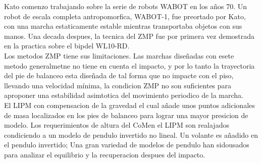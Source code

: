 \documentclass[10pt,onecolumn,twoside,letterpaper]{article}
\begin{document}
Kato comenzo trabajando sobre la serie de robots WABOT en los a\~nos 70. Un robot de escala completa antropomorfica, WABOT-1, fue preortado por Kato, con una marcha estaticamente estable mientras transportaba objetos con sus manos. Una decada despues, la tecnica del ZMP fue por primera vez demostrada en la practica sobre el bipdel WL10-RD.\cite{Grizzle2014}\\
Los metodos ZMP tiene sus limitaciones. Las marchas dise\~nadas con esete metodo generalmetne no tiene en cuenta el impacto, y por lo tanto la trayectoria del pie de balanceo esta dise\~nada de tal forma que no impacte con el piso, llevando una velocidad m\'inima, la condicion ZMP no son suficientes para aproponer una estabilidad asimtotica del movimiento periodico de la marcha.\cite{Grizzle2014}\\
El LIPM con compensacion de la gravedad el cual a\~nade unos puntos adicionales de masa localizados en los pies de balanceo para lograr una mayor presicion de modelo. Los requerimientos de altura del CoMen el LIPM son realajados condiciendo a un modelo de pendulo invertido no lineal. Un volante es a\~nadido en el pendulo invertido; Una gran variedad de modelos de pendulo han sidousados para analizar el equilibrio y la recuperacion despues del impacto.\cite{Grizzle2014}\\
\end{document}
